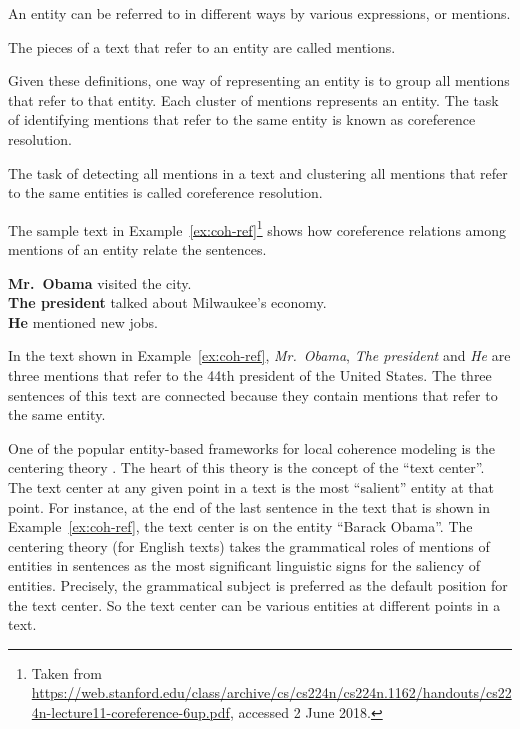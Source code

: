 An entity can be referred to in different ways by various expressions, or mentions. 

\begin{definition}
    The pieces of a text that refer to an entity are called mentions. 
\end{definition}

Given these definitions, one way of representing an entity is to group all mentions that refer to that entity. 
Each cluster of mentions represents an entity. 
The task of identifying mentions that refer to the same entity is known as coreference resolution.  

\begin{definition}
    The task of detecting all mentions in a text and clustering all mentions that refer to the same entities is called coreference resolution. 
\end{definition}

The sample text in Example~\ref{ex:coh-ref}\footnote{Taken from \url{https://web.stanford.edu/class/archive/cs/cs224n/cs224n.1162/handouts/cs224n-lecture11-coreference-6up.pdf}, accessed 2 June 2018.} shows how coreference relations among mentions of an entity relate the sentences. 

\begin{examples}
    \label{ex:coh-ref}
    \textbf{Mr.\ Obama} visited the city. \\
    \textbf{The president} talked about Milwaukee’s economy. \\
    \textbf{He} mentioned new jobs. \\
\end{examples} 

In the text shown in Example~\ref{ex:coh-ref}, \emph{Mr.\ Obama}, \emph{The president} and \emph{He} are three mentions that refer to the 44th president of the United States. 
The three sentences of this text are connected because they contain mentions that refer to the same entity. 

One of the popular entity-based frameworks for local coherence modeling is the centering theory \cite{grosz95}. 
The heart of this theory is the concept of the ``text center''. 
The text center at any given point in a text is the most ``salient'' entity at that point. 
For instance, at the end of the last sentence in the text that is shown in Example~\ref{ex:coh-ref}, the text center is on the entity ``Barack Obama''.
The centering theory (for English texts) takes the grammatical roles of mentions of entities in sentences as the most significant linguistic signs for the saliency of entities. 
Precisely, the grammatical subject is preferred as the default position for the text center. 
So the text center can be various entities at different points in a text. 

